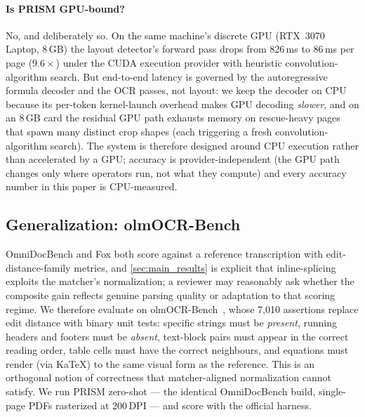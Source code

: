 \paragraph{Is PRISM GPU-bound?} No, and deliberately so. On the same machine's discrete GPU (RTX~3070 Laptop, 8\,GB) the layout detector's forward pass drops from 826\,ms to 86\,ms per page ($9.6\times$) under the CUDA execution provider with heuristic convolution-algorithm search. But end-to-end latency is governed by the autoregressive formula decoder and the OCR passes, not layout: we keep the decoder on CPU because its per-token kernel-launch overhead makes GPU decoding \emph{slower}, and on an 8\,GB card the residual GPU path exhausts memory on rescue-heavy pages that spawn many distinct crop shapes (each triggering a fresh convolution-algorithm search). The system is therefore designed around CPU execution rather than accelerated by a GPU; accuracy is provider-independent (the GPU path changes only where operators run, not what they compute) and every accuracy number in this paper is CPU-measured.

\subsection{Generalization: olmOCR-Bench}
\label{sec:olmobench}

OmniDocBench and Fox both score against a reference transcription with edit-distance-family metrics, and \cref{sec:main_results} is explicit that inline-splicing exploits the matcher's normalization; a reviewer may reasonably ask whether the composite gain reflects genuine parsing quality or adaptation to that scoring regime. We therefore evaluate on olmOCR-Bench~\cite{olmocr}, whose 7{,}010 assertions replace edit distance with binary unit tests: specific strings must be \emph{present}, running headers and footers must be \emph{absent}, text-block pairs must appear in the correct reading order, table cells must have the correct neighbours, and equations must render (via KaTeX) to the same visual form as the reference. This is an orthogonal notion of correctness that matcher-aligned normalization cannot satisfy. We run PRISM zero-shot --- the identical OmniDocBench build, single-page PDFs rasterized at 200\,DPI --- and score with the official harness.

